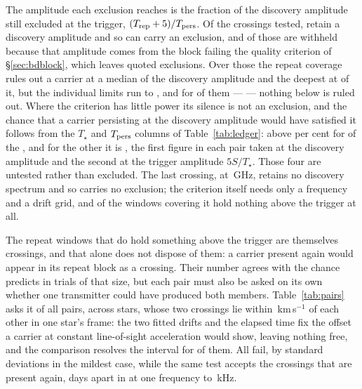 The amplitude each exclusion reaches is the fraction of the discovery
amplitude still excluded at the trigger, $(T_{\rm rep}+5)/T_{\rm pers}$. Of
the \RcNTested{} crossings tested, \RcNExclPoss{} retain a discovery
amplitude and so can carry an exclusion, and \RcNWithheld{} of those are
withheld because that amplitude comes from the block failing the quality
criterion of \S\ref{sec:bdblock}, which leaves \RcNExcl{} quoted exclusions.
Over those the repeat coverage rules out a carrier at a median \RcFracMed{}
of the discovery amplitude and the deepest at \RcFracMin{} of it, but the
individual limits run to \RcFracMax, and for \RcNFracWeak{} of them ---
\RcFracWeakList{} --- nothing below \RcFracWeakLo{} is ruled out. Where the
criterion has little power its silence is not an exclusion, and the chance
that a carrier persisting at the discovery amplitude would have satisfied it
follows from the $T_\star$ and $T_{\rm pers}$ columns of
Table~\ref{tab:ledger}: above \RcPowerLevel{} per cent for \RcNPowerHi{} of
the \RcNExcl, and for the other \RcNPowerLo{} it is \RqLowList, the first
figure in each pair taken at the discovery amplitude and the second at the
trigger amplitude $5S/T_\star$. Those four are untested rather than
excluded. The last crossing, \RcUntStar{} at \RcUntFreq\,GHz, retains no
discovery spectrum and so carries no exclusion; the criterion itself needs
only a frequency and a drift grid, and \CtCritNEmpty{} of the \CtCritNCov{}
windows covering it hold nothing above the trigger at all.

The \WdNExc{} repeat windows that do hold something above the trigger are
themselves crossings, and that alone does not dispose of them: a carrier
present again would appear in its repeat block as a crossing. Their number
agrees with the \WdExpect{} chance predicts in trials of that size, but each
pair must also be asked on its own whether one transmitter could have
produced both members. Table~\ref{tab:pairs} asks it of all \TjNPair{} pairs,
across \TjNStarPair{} stars, whose two crossings lie within
\WdHalfKms\,km\,s$^{-1}$ of each other in one star's frame: the two fitted
drifts and the elapsed time fix the offset a carrier at constant
line-of-sight acceleration would show, leaving nothing free, and the
comparison resolves the interval for \TjNPower{} of them. All \TjNPower{}
fail, by \TjSigMin{} standard deviations in the mildest case, while the same
test accepts the \TjCtlStar{} crossings that are present again, \TjCtlDtD{}
days apart in \TjCtlLine{} at one frequency to \TjCtlOffKHz\,kHz.

